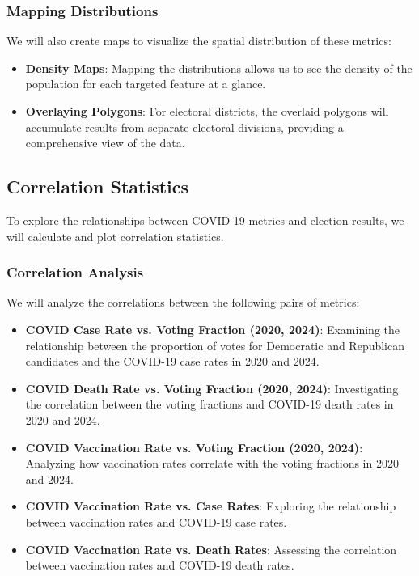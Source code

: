 \documentclass[10pt,journal,compsoc]{IEEEtran}
\begin{document}
\subsubsection{Mapping Distributions}
We will also create maps to visualize the spatial distribution of these metrics:
\begin{itemize}
    \item \textbf{Density Maps}: Mapping the distributions allows us to see the density of the population for each targeted feature at a glance.
    \item \textbf{Overlaying Polygons}: For electoral districts, the overlaid polygons will accumulate results from separate electoral divisions, providing a comprehensive view of the data.
\end{itemize}

\subsection{Correlation Statistics}

To explore the relationships between COVID-19 metrics and election results, we will calculate and plot correlation statistics.

\subsubsection{Correlation Analysis}
We will analyze the correlations between the following pairs of metrics:
\begin{itemize}
    \item \textbf{COVID Case Rate vs. Voting Fraction (2020, 2024)}: Examining the relationship between the proportion of votes for Democratic and Republican candidates and the COVID-19 case rates in 2020 and 2024.
    \item \textbf{COVID Death Rate vs. Voting Fraction (2020, 2024)}: Investigating the correlation between the voting fractions and COVID-19 death rates in 2020 and 2024.
    \item \textbf{COVID Vaccination Rate vs. Voting Fraction (2020, 2024)}: Analyzing how vaccination rates correlate with the voting fractions in 2020 and 2024.
    \item \textbf{COVID Vaccination Rate vs. Case Rates}: Exploring the relationship between vaccination rates and COVID-19 case rates.
    \item \textbf{COVID Vaccination Rate vs. Death Rates}: Assessing the correlation between vaccination rates and COVID-19 death rates.
\end{itemize}
\end{document}
